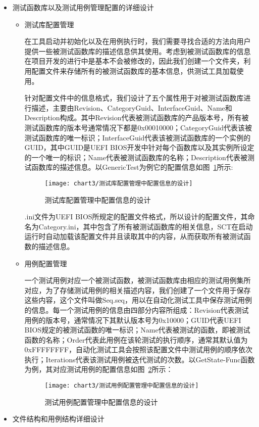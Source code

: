		\begin{itemize}
			\item 测试函数库以及测试用例管理配置的详细设计
				\begin{itemize}
					\item 测试库配置管理
					
					在工具启动并初始化以及在用例执行时，我们需要寻找合适的方法向用户提供一些被测试函数库的描述信息供其使用。考虑到被测试函数库的信息在项目开发的进行中是基本不会被修改的，因此我们创建一个文件夹，利用配置文件来存储所有的被测试函数库的基本信息，供测试工具加载使用。
						
					针对配置文件中的信息格式，我们设计了五个属性用于对被测试函数库进行描述，主要由Revision、CategoryGuid、InterfaceGuid、Name和Description构成。其中Revision代表被测试函数库的产品版本号，所有被测试函数库的版本号通常情况下都是0x00010000；CategoryGuid代表该被测试函数库的唯一标识；InterfaceGuid代表该被测试函数库的一个实例的GUID，其中GUID是UEFI BIOS开发中针对每个函数库以及其实例所设定的一个唯一的标识；Name代表被测试函数库的名称；Description代表被测试函数库的描述信息。以GenericTest为例它的配置信息如图~\ref{fig:测试库配置管理中配置信息的设计}所示:
						\begin{figure}[H] %
							\centering
							\texttt{[image: chart3/测试库配置管理中配置信息的设计]}
							\caption{测试库配置管理中配置信息的设计}
							\label{fig:测试库配置管理中配置信息的设计}
						\end{figure}
							
					.ini文件为UEFI BIOS所规定的配置文件格式，所以设计的配置文件，其命名为Category.ini，其中包含了所有被测试函数库的相关信息，SCT在启动运行时自动加载该配置文件并且读取其中的内容，从而获取所有被测试函数的描述信息。
					
					\item 用例配置管理
					
						一个测试用例对应一个被测试函数，被测试函数库由相应的测试用例集所对应，为了存储测试用例的相关描述内容，我们创建了一个文件用于保存这些内容，这个文件叫做Seq.seq，用以在自动化测试工具中保存测试用例的信息。每一个测试用例的信息由四部分内容所组成：Revision代表测试用例的版本号，通常情况下其默认版本号为0x10000；GUID代表UEFI BIOS规定的被测试函数的唯一标识；Name代表被测试的函数，即被测试函数的名称；Order代表此用例在该轮测试的执行顺序，通常其默认值为0xFFFFFFFF，自动化测试工具会按照该配置文件中测试用例的顺序依次执行；Iterations代表该测试用例被迭代测试的次数。以GetState-Func函数为例，其对应测试用例的配置信息如图~\ref{fig:测试用例配置管理中配置信息的设计}所示：
							\begin{figure}[H] %
								\centering
								\texttt{[image: chart3/测试用例配置管理中配置信息的设计]}
								\caption{测试用例配置管理中配置信息的设计}
								\label{fig:测试用例配置管理中配置信息的设计}
							\end{figure}
				\end{itemize}
			\item 文件结构和用例结构详细设计
			

\end{itemize}
